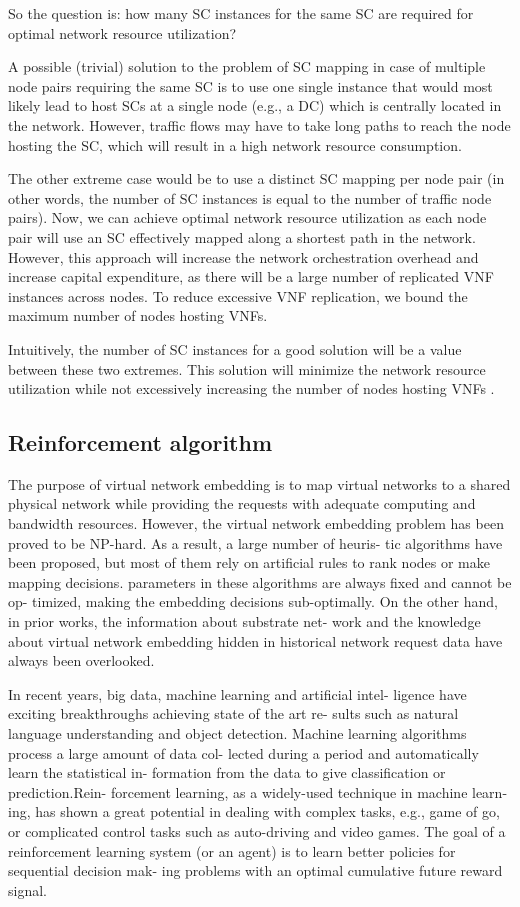 \documentclass[12pt]{article}
\begin{document}
So the question is: how many SC instances for the same SC are required for optimal network resource utilization?

A possible (trivial) solution to the problem of SC mapping in case of multiple node pairs requiring the same SC is to use one single instance that would most likely lead to host SCs at a single node (e.g., a DC) which is centrally located in the network. However, traffic flows may have to take long paths to reach the node hosting the SC, which will result in a high network resource consumption.

The other extreme case would be to use a distinct SC mapping per node pair (in other words, the number of SC instances is equal to the number of traffic node pairs). Now, we can achieve optimal network resource utilization as each node pair will use an SC effectively mapped along a shortest path in the network. However, this approach will increase the network orchestration overhead and increase capital expenditure, as there will be a large number of replicated VNF instances across nodes. To reduce excessive VNF replication, we bound the maximum number of nodes hosting VNFs.

Intuitively, the number of SC instances for a good solution will be a value between these two extremes. This solution will minimize the network resource utilization while not excessively increasing the number of nodes hosting VNFs \cite{Fourth}.
\subsection{Reinforcement algorithm}
The purpose of virtual network embedding is to map
virtual networks to a shared physical network while providing the
requests with adequate computing and bandwidth resources.
However, the virtual network embedding problem has been
proved to be NP-hard. As a result, a large number of heuris-
tic algorithms have been proposed, but most of them rely
on artificial rules to rank nodes or make mapping decisions.
parameters in these algorithms are always fixed and cannot be op-
timized, making the embedding decisions sub-optimally. On the
other hand, in prior works, the information about substrate net-
work and the knowledge about virtual network embedding hidden
in historical network request data have always been overlooked.

In recent years, big data, machine learning and artificial intel-
ligence have exciting breakthroughs achieving state of the art re-
sults such as natural language understanding and object detection.
Machine learning algorithms process a large amount of data col-
lected during a period and automatically learn the statistical in-
formation from the data to give classification or prediction.Rein-
forcement learning, as a widely-used technique in machine learn-
ing, has shown a great potential in dealing with complex tasks, e.g.,
game of go, or complicated control tasks such as auto-driving
and video games. The goal of a reinforcement learning system
(or an agent) is to learn better policies for sequential decision mak-
ing problems with an optimal cumulative future reward signal.
\end{document}
